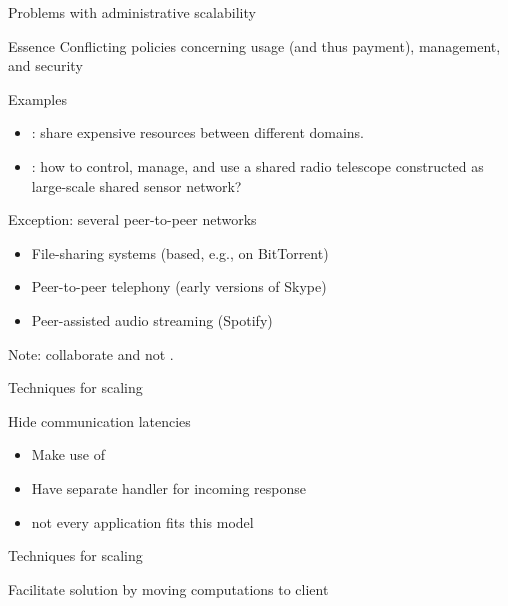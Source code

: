 \begin{slide}{Problems with administrative scalability}
  \begin{block}{Essence}
    Conflicting policies concerning usage (and thus payment), management, and security
  \end{block}

  \begin{exampleblock}{Examples}
    \begin{itemize}\firmlist
    \item {}: share expensive resources between different domains. 
    \item {}: how to control, manage, and use a shared radio telescope constructed as
      large-scale shared sensor network?
    \end{itemize}
  \end{exampleblock}

  \begin{alertblock}{Exception: several peer-to-peer networks}
    \begin{itemize}\tightlist
    \item File-sharing systems (based, e.g., on BitTorrent)
    \item Peer-to-peer telephony (early versions of Skype)
    \item Peer-assisted audio streaming (Spotify)
    \end{itemize}\vspace*{-6pt}
    Note:  collaborate and not .
  \end{alertblock}
\end{slide}
\begin{slide}{Techniques for scaling}
  \begin{block}{Hide communication latencies}
    \begin{itemize}
    \item Make use of 
    \item Have separate handler for incoming response
    \item {} not every application fits this model
    \end{itemize}
  \end{block}
\end{slide}
\begin{slide}{Techniques for scaling}
  \begin{block}{Facilitate solution by moving computations to client}
    \begin{center}
       \newline
       \newline
    \end{center}
  \end{block}
\end{slide}
